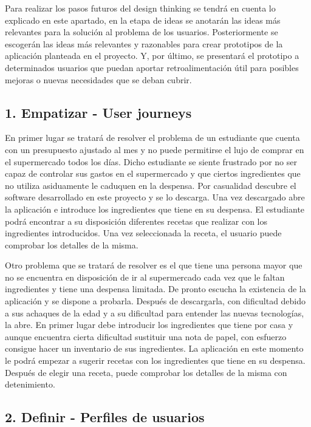 Para realizar los pasos futuros del \gls{design thinking} se tendrá en cuenta lo explicado en este apartado, en la etapa de ideas se anotarán las ideas más relevantes para la solución al problema de los usuarios. Posteriormente se escogerán las ideas más relevantes y razonables para crear prototipos de la aplicación planteada en el proyecto. Y, por último, se presentará el prototipo a determinados usuarios que puedan aportar retroalimentación útil para posibles mejoras o nuevas necesidades que se deban cubrir.

\subsection{1. Empatizar - User journeys}

En primer lugar se tratará de resolver el problema de un estudiante que cuenta con un presupuesto ajustado al mes y no puede permitirse el lujo de comprar en el supermercado todos los días. Dicho estudiante se siente frustrado por no ser capaz de controlar sus gastos en el supermercado y que ciertos ingredientes que no utiliza asiduamente le caduquen en la despensa. Por casualidad descubre el software desarrollado en este proyecto y se lo descarga. Una vez descargado abre la aplicación e introduce los ingredientes que tiene en su despensa. El estudiante podrá encontrar a su disposición diferentes recetas que realizar con los ingredientes introducidos. Una vez seleccionada la receta, el usuario puede comprobar los detalles de la misma.

Otro problema que se tratará de resolver es el que tiene una persona mayor que no se encuentra en disposición de ir al supermercado cada vez que le faltan ingredientes y tiene una despensa limitada. De pronto escucha la existencia de la aplicación y se dispone a probarla. Después de descargarla, con dificultad debido a sus achaques de la edad y a su dificultad para entender las nuevas tecnologías, la abre. En primer lugar debe introducir los ingredientes que tiene por casa y aunque encuentra cierta dificultad sustituir una nota de papel, con esfuerzo consigue hacer un inventario de sus ingredientes. La aplicación en este momento le podrá empezar a sugerir recetas con los ingredientes que tiene en su despensa. Después de elegir una receta, puede comprobar los detalles de la misma con detenimiento.

\subsection{2. Definir - Perfiles de usuarios}
